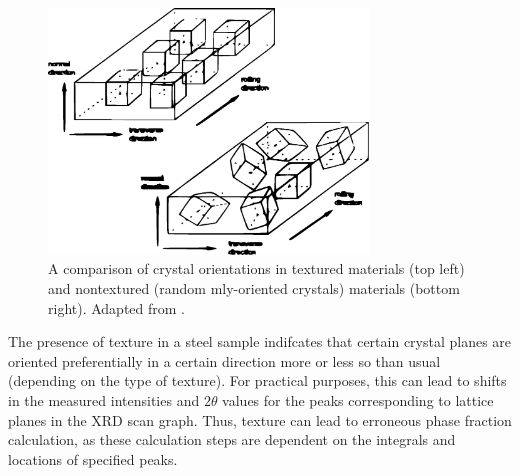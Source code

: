 \documentclass[10pt]{article}
\begin{document}
\begin{figure}[h]
    \centering
    \includegraphics[width=8.5cm]{fig7}
    \caption{\label{tab1}A comparison of crystal orientations in textured materials (top left) and nontextured (random
    mly-oriented crystals) materials (bottom right). Adapted from \cite{ref02}.} 
    \end{figure}

The presence of texture in a steel sample indifcates that certain crystal planes are oriented preferentially in a certain direction 
more or less so than usual (depending on the type of texture). For practical purposes, this can lead to shifts in the measured intensities and $2\theta$
values for the peaks corresponding to lattice planes in the XRD scan graph. Thus, texture can lead to erroneous phase fraction calculation, 
as these calculation steps are dependent on the integrals and locations of specified peaks.
\end{document}
